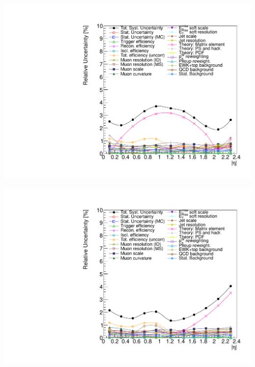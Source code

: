 {
\colb[T]
\centering
{}
\includegraphics[width=1.0\textwidth]{dates/20130602/figures/v26.allqcd/Wmn_SYSTEM_2D_PT20_NEG_Unc_2d_Slice_6}

\centering
{}
\includegraphics[width=1.0\textwidth]{dates/20130602/figures/v26.allqcd/Wmn_SYSTEM_2D_PT20_POS_Unc_2d_Slice_6}
\cole
}

